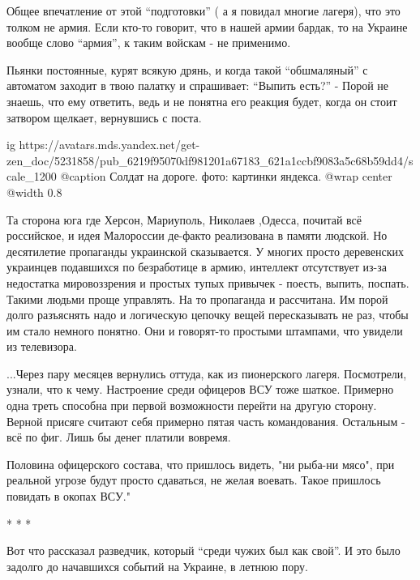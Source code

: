 Общее впечатление от этой \enquote{подготовки} ( а я повидал многие лагеря), что это
толком не армия. Если кто-то говорит, что в нашей армии бардак, то на Украине
вообще слово \enquote{армия}, к таким войскам - не применимо.

\begin{zznagolos}
Пьянки постоянные, курят всякую дрянь, и когда такой \enquote{обшмаляный} с
автоматом заходит в твою палатку и спрашивает: \enquote{Выпить есть?} - Порой
не знаешь, что ему ответить, ведь и не понятна его реакция будет, когда он
стоит затвором щелкает, вернувшись с поста.
\end{zznagolos}

\ifcmt
  ig https://avatars.mds.yandex.net/get-zen_doc/5231858/pub_6219f95070df981201a67183_621a1ccbf9083a5c68b59dd4/scale_1200
	@caption Солдат на дороге. фото: картинки яндекса.
  @wrap center
  @width 0.8
\fi

Та сторона юга где Херсон, Мариуполь, Николаев ,Одесса, почитай всё российское,
и идея Малороссии де-факто реализована в памяти людской. Но десятилетие
пропаганды украинской сказывается. У многих просто деревенских украинцев
подавшихся по безработице в армию, интеллект отсутствует из-за недостатка
мировоззрения и простых тупых привычек - поесть, выпить, поспать. Такими людьми
проще управлять. На то пропаганда и рассчитана. Им порой долго разъяснять надо и
логическую цепочку вещей пересказывать не раз, чтобы им стало немного понятно.
Они и говорят-то простыми штампами, что увидели из телевизора. 

\begin{zznagolos}
...Через пару месяцев вернулись оттуда, как из пионерского лагеря. Посмотрели,
узнали, что к чему. Настроение среди офицеров ВСУ тоже шаткое. Примерно одна
треть способна при первой возможности перейти на другую сторону. Верной присяге
считают себя примерно пятая часть командования. Остальным - всё по фиг. Лишь бы
денег платили вовремя.
\end{zznagolos}

Половина офицерского состава, что пришлось видеть, "ни рыба-ни мясо", при
реальной угрозе будут просто сдаваться, не желая воевать. Такое пришлось
повидать в окопах ВСУ."

* * *

Вот что рассказал разведчик, который \enquote{среди чужих был как свой}. И это было
задолго до начавшихся событий на Украине, в летнюю пору.  
